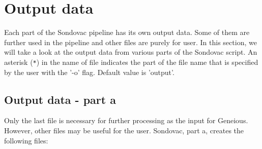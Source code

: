 \section{Output data}
Each part of the Sondovac pipeline has its own output data. Some of them are further used in the pipeline and other files are purely for user. In this section, we will 
take a look at the output data from various parts of the Sondovac script. 
An asterisk (\verb_*_) in the name of file indicates the part of the file name that is specified by the user with the '-o' flag. Default value is 'output'. 

\subsection{Output data - part a}

Only the last file is necessary for further processing as the input for Geneious. However, other files may be useful for the user. 
Sondovac, part a, creates the following files: 


